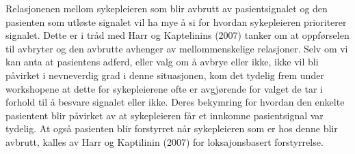 \noindent
Relasjonenen mellom sykepleieren som blir avbrutt av pasientsignalet og den pasienten som utløste signalet vil ha mye å si for hvordan sykepleieren prioriterer signalet. Dette er i tråd med Harr og Kaptelinins (2007) tanker om at oppførselen til avbryter og den avbrutte avhenger av mellommenskelige relasjoner. Selv om vi kan anta at pasientens adferd, eller valg om å avbrye eller ikke, ikke vil bli påvirket i nevneverdig grad i denne situasjonen, kom det tydelig frem under workshopene at dette for sykepleierene ofte er avgjørende for valget de tar i forhold til å besvare signalet eller ikke.  
Deres bekymring for hvordan den enkelte pasientent blir påvirket av at sykepleieren får et innkomne pasientsignal var tydelig. At også pasienten blir forstyrret når sykepleieren som er hos denne blir avbrutt, kalles av Harr og Kaptilinin (2007) for loksajonsbasert forstyrrelse. 